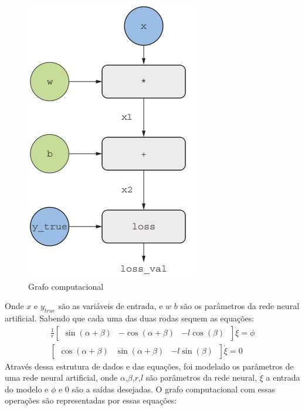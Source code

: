 \begin{figure}[H]
    \label{fig:grafo:computacional}
    \centering
    \includegraphics[scale=0.5]{figuras/grafo_computacional.png}
    \caption{Grafo computacional}
\end{figure}
Onde $x$ e $y_{true}$ são as variáveis de entrada, e $w$ $b$ são
os parâmetros da rede neural artificial. 
Sabendo que cada uma das duas rodas sequem as equações:
\begin{align}
    \frac{1}{r}
    \begin{bmatrix}
        \sin(\alpha + \beta) &  -\cos(\alpha + \beta) & -l\cos(\beta) \
    \end{bmatrix}
    \dot{\xi}
    = \phi \\
    \begin{bmatrix}
        \cos(\alpha + \beta) &  \sin(\alpha + \beta) & -l\sin(\beta) \
    \end{bmatrix}
    \dot{\xi}
    = 0 
\end{align}
Através dessa estrutura de dados e das equações, foi
modelado os parâmetros de uma rede neural artificial,
onde $\alpha$,$\beta$,$r$,$l$ são parâmetros da rede neural,
$\dot{\xi}$ a entrada do modelo e $\phi$ e $0$  são a saídas desejadas.
O grafo computacional com essas operações são representadas por essas equações:

